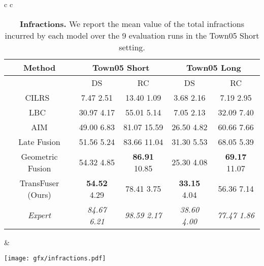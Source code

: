 \documentclass[final]{cvpr}
\begin{document}
\begin{table*}[t]
    \begin{tabular}{c c}
        \begin{subtable}[h]{0.58\textwidth}
            \small
            \setlength{\tabcolsep}{2.2pt}
            \centering
            \begin{tabular}{c | c c | c c }
                \textbf{Method} & \multicolumn{2}{c|}{\textbf{Town05 Short}} & \multicolumn{2}{c}{\textbf{Town05 Long}} \\
                \hline
                & DS  & RC  & DS  & RC  \\
                \hline
                CILRS~\cite{Codevilla2019ICCV} & 7.47  2.51 & 13.40  1.09 & 3.68  2.16 & 7.19  2.95 \\
                LBC~\cite{Chen2019CORL} & 30.97  4.17 & 55.01  5.14 & 7.05  2.13 & 32.09  7.40 \\
                AIM & 49.00  6.83 & 81.07  15.59 & 26.50  4.82 & 60.66  7.66 \\
                Late Fusion & 51.56  5.24 & 83.66  11.04 & 31.30  5.53 & 68.05  5.39 \\
                Geometric Fusion & 54.32  4.85 & \textbf{86.91}  10.85 & 25.30  4.08 & \textbf{69.17}  11.07 \\
                TransFuser (Ours) & \textbf{54.52}  4.29 & 78.41  3.75 & \textbf{33.15}  4.04 & 56.36  7.14 \\
                \hline
                \textit{Expert} & \textit{84.67  6.21} & \textit{98.59  2.17} & \textit{38.60  4.00} & \textit{77.47  1.86} \\
                \hline
            \end{tabular}
            \caption{\textbf{Driving Performance.} We report the mean and standard deviation over 9 runs of each method (3 training seeds, each seed evaluated 3 times) on 2 metrics: Route Completion (RC) and Driving Score (DS), in Town05 Short and Town05 Long settings comprising high densities of dynamic agents and scenarios.}
            \vspace{-0.2cm}
            \label{tab:driving_performance}
        \end{subtable} 
        & 
        \begin{subtable}[h]{0.36\textwidth}
            \texttt{[image: gfx/infractions.pdf]}
            \caption{\textbf{Infractions.} We report the mean value of the total infractions incurred by each model over the 9 evaluation runs in the Town05 Short setting.}

\end{subtable}
\end{tabular}
\end{table*}
\end{document}
